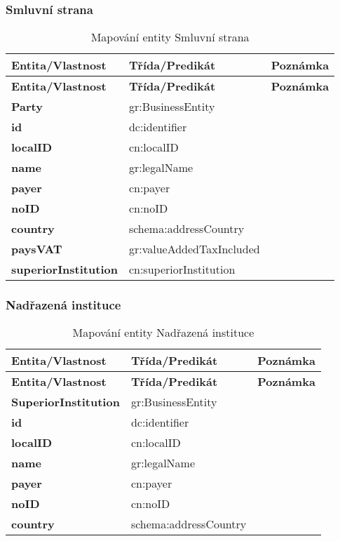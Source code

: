 \subsubsection*{Smluvní strana}

\begin{center}
\begin{longtable}{lll}
\label{grid_mlmmh} \\
\multicolumn{1}{l}{\textbf{Entita/Vlastnost}} & 
\multicolumn{1}{l}{\textbf{Třída/Predikát}} & 
\multicolumn{1}{l}{\textbf{Poznámka}} \\ \hline 
\endfirsthead
\multicolumn{1}{l}{\textbf{Entita/Vlastnost}} & 
\multicolumn{1}{l}{\textbf{Třída/Predikát}} & 
\multicolumn{1}{l}{\textbf{Poznámka}} \\ \hline 
\hline
\endhead
\endfoot
\caption{Mapování entity Smluvní strana}
\endlastfoot
\textbf{Party} & gr:BusinessEntity \\
\textbf{id} & dc:identifier \\
\textbf{localID} & cn:localID \\
\textbf{name} & gr:legalName \\
\textbf{payer} & cn:payer \\
\textbf{noID} & cn:noID \\
\textbf{country} & schema:addressCountry \\
\textbf{paysVAT} & gr:valueAddedTaxIncluded \\
\textbf{superiorInstitution} & cn:superiorInstitution \\
\end{longtable}
\end{center}

\subsubsection*{Nadřazená instituce}

\begin{center}
\begin{longtable}{lll}
\label{grid_mlmmh} \\
\multicolumn{1}{l}{\textbf{Entita/Vlastnost}} & 
\multicolumn{1}{l}{\textbf{Třída/Predikát}} & 
\multicolumn{1}{l}{\textbf{Poznámka}} \\ \hline 
\endfirsthead
\multicolumn{1}{l}{\textbf{Entita/Vlastnost}} & 
\multicolumn{1}{l}{\textbf{Třída/Predikát}} & 
\multicolumn{1}{l}{\textbf{Poznámka}} \\ \hline 
\hline
\endhead
\endfoot
\caption{Mapování entity Nadřazená instituce}
\endlastfoot
\textbf{SuperiorInstitution} & gr:BusinessEntity \\
\textbf{id} & dc:identifier \\
\textbf{localID} & cn:localID \\
\textbf{name} & gr:legalName \\
\textbf{payer} & cn:payer \\
\textbf{noID} & cn:noID \\
\textbf{country} & schema:addressCountry \\
\end{longtable}
\end{center}

